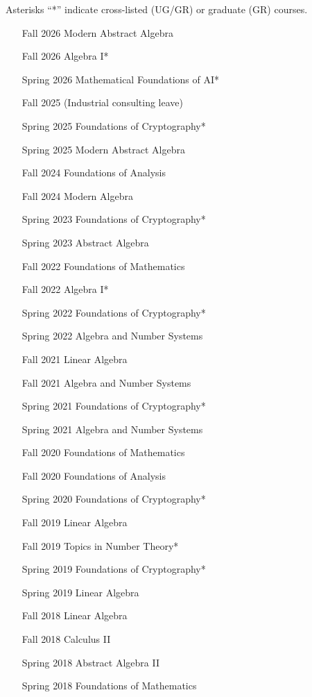 \documentclass[11pt,a4paper,ragged2e,withhyper]{altacv}
\begin{document}
Asterisks ``*'' indicate cross-listed (UG/GR) or graduate (GR) courses.
\begin{multicols}{2}
\begin{enumerate}[labelindent=0pt,labelwidth=2cm,leftmargin=!]
\item[Fall 2026] Modern Abstract Algebra
\item[Fall 2026] Algebra I*
\item[Spring 2026] Mathematical Foundations of AI*
\item[Fall 2025] (Industrial consulting leave)
\item[Spring 2025] Foundations of Cryptography*
\item[Spring 2025] Modern Abstract Algebra
\item[Fall 2024] Foundations of Analysis
\item[Fall 2024] Modern Algebra
\item[Spring 2023] Foundations of Cryptography*
\item[Spring 2023] Abstract Algebra
\item[Fall 2022] Foundations of Mathematics
\item[Fall 2022] Algebra I*
\item[Spring 2022] Foundations of Cryptography*
\item[Spring 2022] Algebra and Number Systems
\item[Fall 2021] Linear Algebra
\item[Fall 2021] Algebra and Number Systems
\item[Spring 2021] Foundations of Cryptography*
\item[Spring 2021] Algebra and Number Systems
\item[Fall 2020] Foundations of Mathematics
\item[Fall 2020] Foundations of Analysis
\item[Spring 2020] Foundations of Cryptography*
\item[Fall 2019] Linear Algebra
\item[Fall 2019] Topics in Number Theory*
\item[Spring 2019] Foundations of Cryptography*
\item[Spring 2019] Linear Algebra
\item[Fall 2018] Linear Algebra
\item[Fall 2018] Calculus II
\item[Spring 2018] Abstract Algebra II
\item[Spring 2018] Foundations of Mathematics

\end{enumerate}
\end{multicols}
\end{document}
